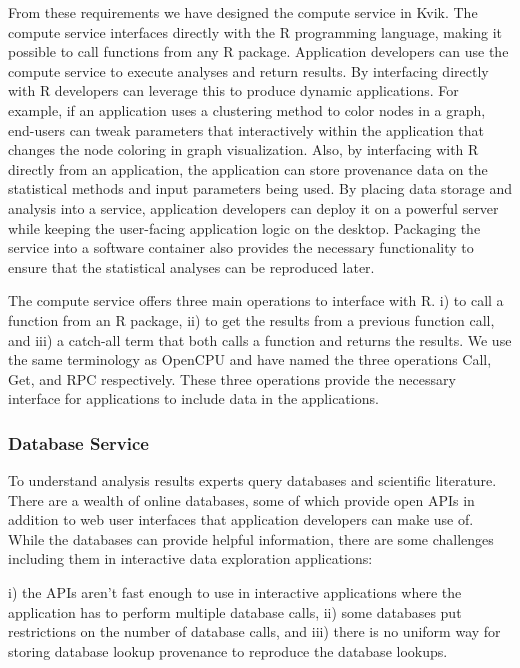 From these requirements we have designed the compute service in Kvik. The compute
service interfaces directly with the R programming language, making it possible
to call functions from any R package. Application developers can use the
compute service to execute analyses and return results. By interfacing directly
with R developers can leverage this to produce dynamic applications. For example,
if an application uses a clustering method to color nodes in a graph, end-users
can tweak parameters that interactively within the application that changes the
node coloring in graph visualization. Also, by interfacing with R directly from
an application, the application can store provenance data on the statistical
methods and input parameters being used. 
By placing data storage and analysis into a service, application developers can
deploy it on a powerful server while keeping the user-facing application logic
on the desktop. Packaging the service into a software container also
provides the necessary functionality to ensure that the statistical analyses can
be reproduced later. 

The compute service offers three main operations to interface with R. 
i) to call a function from an R package,
ii) to get the results from a previous function call,
and iii) a catch-all term that both calls a function and returns the results. 
We use the same terminology as OpenCPU\cite{opencpu} and have named the three
operations Call, Get, and RPC respectively. These three operations provide the
necessary interface for applications to include data in the applications.

\subsubsection*{Database Service} 
To understand analysis results experts query databases and scientific
literature. There are a wealth of online databases, some of which provide open
APIs in addition to web user interfaces that application developers can make use
of. While the databases can provide helpful information, there are some
challenges including them in interactive data exploration applications: 

i) the APIs aren't fast enough to use in interactive applications where the
application has to perform multiple database calls, 
ii) some databases put restrictions on the number of database calls, and 
iii) there is no uniform way for storing database lookup provenance to reproduce
the database lookups. 

